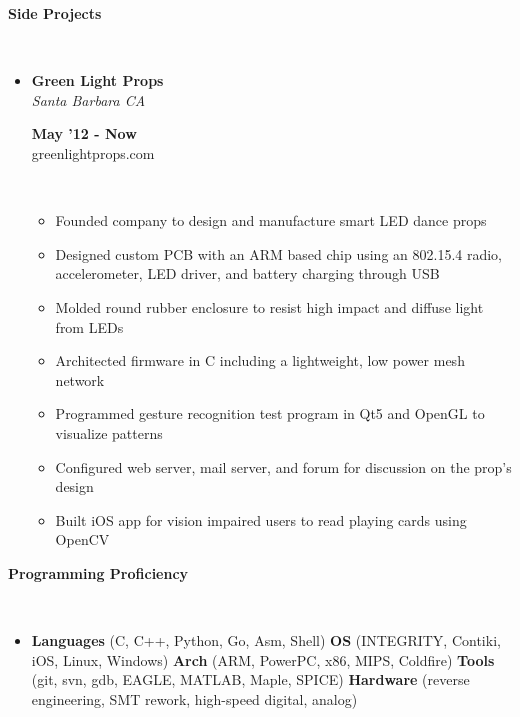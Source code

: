 \documentclass[a4paper,11pt]{article}
\newcommand{\isep}{-1 pt}
\newcommand{\lsep}{-0.2cm}
\newcommand{\resheading}[1]{{\small \colorbox{mygrey}{\begin{minipage}{0.975\textwidth}{\textbf{#1 \vphantom{p\^{E}}}}\end{minipage}}}}
\newcommand{\workexp}[4]{
\begin{minipage}[t]{7cm}
\begin{flushleft}
\textbf{#1} \\
\indent \emph{#2}\\
\end{flushleft}
\end{minipage}
\hfill
\begin{minipage}[t]{7cm}
\begin{flushright}
\textbf{#3} \\
\indent #4 \\
\end{flushright}
\end{minipage}
}
\begin{document}

\resheading{\textbf{Side Projects}}\\[\lsep]

\begin{itemize}
\item \workexp{Green Light Props}{Santa Barbara CA}{May '12 - Now}{greenlightprops.com}
\\[-0.3cm]
	\begin{itemize} \itemsep \isep
	\item Founded company to design and manufacture smart LED dance props
	\item Designed custom PCB with an ARM based chip using an 802.15.4 radio, accelerometer, LED driver, and battery charging through USB
	\item Molded round rubber enclosure to resist high impact and diffuse light from LEDs
	\item Architected firmware in C including a lightweight, low power mesh network
	\item Programmed gesture recognition test program in Qt5 and OpenGL to visualize patterns
	\item Configured web server, mail server, and forum for discussion on the prop's design
	\item Built iOS app for vision impaired users to read playing cards using OpenCV
	\end{itemize}
\end{itemize}



\resheading{\textbf{Programming Proficiency} }\\[\lsep]
\begin{itemize}
\item \noindent \textbf{Languages} (C, C++, Python, Go, Asm, Shell)  
\textbf{OS} (INTEGRITY, Contiki, iOS, Linux, Windows) 
\textbf{Arch} (ARM, PowerPC, x86, MIPS, Coldfire) 
\textbf{Tools} (git, svn, gdb, EAGLE, MATLAB, Maple, SPICE) 
\textbf{Hardware} (reverse engineering, SMT rework, high-speed digital, analog)
\end{itemize} 


\end{document}
